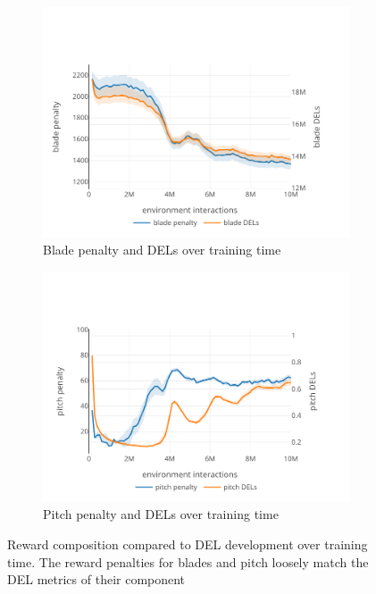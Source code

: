 \begin{figure}
  \centering
  \begin{subfigure}[b]{0.48\textwidth}
      \centering
      \includegraphics[width=\textwidth]{images/reward_analysis_blade.pdf}
      \caption{Blade penalty and DELs over training time}
      \label{fig:rc-blade}
  \end{subfigure}
  \begin{subfigure}[b]{0.48\textwidth}
      \centering
      \includegraphics[width=\textwidth]{images/reward_analysis_pitch.pdf}
      \caption{Pitch penalty and DELs over training time}
      \label{fig:rc-pitch}
  \end{subfigure}
  \caption{Reward composition compared to DEL development over training time. The reward penalties for blades and pitch loosely match the DEL metrics of their component}
  \label{fig:rc}
\end{figure}

